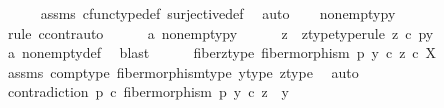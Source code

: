 \begin{isabellebody}
\ \ \ \ \isamarkupfalse%
\ assms\ cfunc{\isacharunderscore}{\kern0pt}type{\isacharunderscore}{\kern0pt}def\ surjective{\isacharunderscore}{\kern0pt}def\ \isamarkupfalse%
\ auto\isanewline
\isanewline
\ \ \isamarkupfalse%
\ {\isachardoublequoteopen}{\isasymnot}nonempty{\isacharparenleft}{\kern0pt}p\isactrlsup {\isacharminus}{\kern0pt}y{}{\isacharbraceright}{\kern0pt}{\isacharparenright}{\kern0pt}{\isachardoublequoteclose}\isanewline
\ \ \isamarkupfalse%
\ {\isacharparenleft}{\kern0pt}rule\ ccontr{\isacharcomma}{\kern0pt}auto{\isacharparenright}{\kern0pt}\isanewline
\ \ \ \ \isamarkupfalse%
\ a{}{\isacharcolon}{\kern0pt}\ {\isachardoublequoteopen}nonempty{\isacharparenleft}{\kern0pt}p\isactrlsup {\isacharminus}{\kern0pt}y{}{\isacharbraceright}{\kern0pt}{\isacharparenright}{\kern0pt}{\isachardoublequoteclose}\isanewline
\ \ \ \ \isamarkupfalse%
\ z\ \ z{\isacharunderscore}{\kern0pt}type{\isacharbrackleft}{\kern0pt}type{\isacharunderscore}{\kern0pt}rule{\isacharbrackright}{\kern0pt}{\isacharcolon}{\kern0pt}\ {\isachardoublequoteopen}z\ {\isasymin}\isactrlsub c\ p\isactrlsup {\isacharminus}{\kern0pt}y{}{\isacharbraceright}{\kern0pt}{\isachardoublequoteclose}\isanewline
\ \ \ \ \ \ \isamarkupfalse%
\ a{}\ nonempty{\isacharunderscore}{\kern0pt}def\ \isamarkupfalse%
\ blast\isanewline
\ \ \ \ \isamarkupfalse%
\ fiber{\isacharunderscore}{\kern0pt}z{\isacharunderscore}{\kern0pt}type{\isacharcolon}{\kern0pt}\ {\isachardoublequoteopen}fiber{\isacharunderscore}{\kern0pt}morphism\ p\ y{}\ {\isasymcirc}\isactrlsub c\ z\ {\isasymin}\isactrlsub c\ X{\isachardoublequoteclose}\isanewline
\ \ \ \ \ \ \isamarkupfalse%
\ assms{\isacharparenleft}{\kern0pt}{}{\isacharparenright}{\kern0pt}\ comp{\isacharunderscore}{\kern0pt}type\ fiber{\isacharunderscore}{\kern0pt}morphism{\isacharunderscore}{\kern0pt}type\ y{}{\isacharunderscore}{\kern0pt}type\ z{\isacharunderscore}{\kern0pt}type\ \isamarkupfalse%
\ auto\isanewline
\ \ \ \ \isamarkupfalse%
\ contradiction{\isacharcolon}{\kern0pt}\ {\isachardoublequoteopen}p\ {\isasymcirc}\isactrlsub c\ fiber{\isacharunderscore}{\kern0pt}morphism\ p\ y{}\ {\isasymcirc}\isactrlsub c\ z\ {\isacharequal}{\kern0pt}\ y{}{\isachardoublequoteclose}\isanewline

\end{isabellebody}
